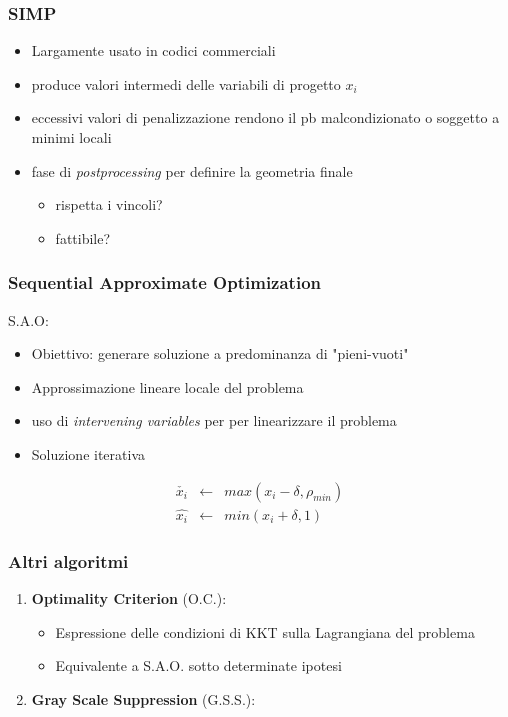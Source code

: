 \documentclass{beamer}
\begin{document}
\begin{frame}
	\frametitle{SIMP}
	\begin{itemize}
		\item Largamente usato in codici commerciali
		\item produce valori intermedi delle variabili di progetto $x_i$
		\item eccessivi valori di penalizzazione rendono il pb malcondizionato o soggetto a minimi locali
		\item fase di \textit{postprocessing} per definire la geometria finale
		\begin{itemize}
			\item rispetta i vincoli?
			\item fattibile?
		\end{itemize}
	\end{itemize}
\end{frame}



\begin{frame}
	\frametitle{Sequential Approximate Optimization}
	S.A.O: \cite{haftka2012elements}
	\begin{itemize}
		\item Obiettivo: generare soluzione a predominanza di "pieni-vuoti"
		\item Approssimazione lineare locale del problema
		\item uso di \textit{intervening variables} per per linearizzare il problema
		\item Soluzione iterativa
	\end{itemize}
	
	\begin{eqnarray}
	\check{x_i} & \leftarrow & max(x_i - \delta, \rho_{min}) \\
	\hat{x_i} & \leftarrow & min(x_i + \delta, 1)
	\end{eqnarray}
	
\end{frame}


\begin{frame}
	\frametitle{Altri algoritmi}
	\begin{enumerate}
		\item \textbf{Optimality Criterion} (O.C.): \cite{bendsoe1989optimal}
		\begin{itemize}
			\item Espressione delle condizioni di KKT sulla Lagrangiana del problema
			\item Equivalente a S.A.O. sotto determinate ipotesi 
		\end{itemize}
		\item \textbf{Gray Scale Suppression} (G.S.S.): \cite{groenwold2009simple}
	\end{enumerate}
\end{frame}
\end{document}
